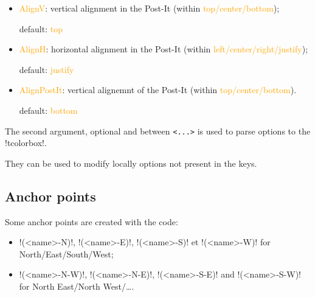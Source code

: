 \documentclass[english,a4paper,11pt]{article}
\newcommand\Cle[1]{{\small\sffamily\textlangle \textcolor{orange}{#1}\textrangle}}
\begin{document}
\begin{tipblock}
\begin{itemize}
	\hfill{}default: \Cle{0cm}
	\item \Cle{AlignV}: vertical alignment in the Post-It (within \Cle{top/center/bottom});

	\hfill{}default: \Cle{top}
	\item \Cle{AlignH}: horizontal alignment in the Post-It (within \Cle{left/center/right/justify});

	\hfill{}default: \Cle{justify}
	\item \Cle{AlignPostIt}: vertical alignemnt of the Post-It (within \Cle{top/center/bottom}).

	\hfill{}default: \Cle{bottom}
\end{itemize}
\vspace*{-\baselineskip}\leavevmode
\end{tipblock}

\begin{tipblock}
The second argument, optional and between \texttt{<...>} is used to parse options to the \motcletex!tcolorbox!.

They can be used to modify locally options not present in the keys.
\end{tipblock}

\subsection{Anchor points}

\begin{tipblock}
Some anchor points are created with the code:

\begin{itemize}
	\item \motcletex!(<name>-N)!, \motcletex!(<name>-E)!, \motcletex!(<name>-S)! et \motcletex!(<name>-W)! for North/East/South/West;
	\item \motcletex!(<name>-N-W)!, \motcletex!(<name>-N-E)!, \motcletex!(<name>-S-E)! and \motcletex!(<name>-S-W)! for North East/North West/\ldots.
\end{itemize}
\end{tipblock}

\begin{DemoCode}[]
\begin{center}
\begin{PostItNote}[Rotate=10,Pin=None,Render=tikz,StorePostIt=MySmallNote1]
	\lipsum[1][1-2]
\end{PostItNote}
\end{center}
\end{DemoCode}
\end{document}
